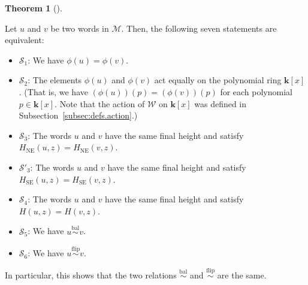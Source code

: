 \documentclass[numbers=enddot,12pt,final,onecolumn,notitlepage]{scrartcl}%
\theoremstyle{definition}
\newtheorem{theo}{Theorem}[section]
\newenvironment{theorem}[1][]
{\begin{theo}[#1]\begin{leftbar}}
{\end{leftbar}\end{theo}}
\newcommand{\W}{\mathcal{W}}
\newcommand{\M}{\mathcal{M}}
\newcommand{\kk}{\mathbf{k}}
\newcommand{\SE}{\operatorname{SE}}
\newcommand{\NE}{\operatorname{NE}}
\newcommand{\balsim}{\overset{\operatorname*{bal}}{\sim}}
\newcommand{\flipsim}{\overset{\operatorname*{flip}}{\sim}}
\newcommand{\tup}[1]{\left( #1 \right)}
\newcommand{\ive}[1]{\left[ #1 \right]}
\begin{document}
\begin{theorem}
\label{thm.DU-eqs2}
Let $u$ and $v$ be two words in $\M$.
Then, the following seven statements are equivalent:

\begin{itemize}
\item $\mathcal{S}_1$: We have $\phi\tup{u} = \phi\tup{v}$.

\item $\mathcal{S}_2$: The elements $\phi\tup{u}$ and
$\phi\tup{v}$ act equally on the polynomial ring $\kk\ive{x}$.
(That is, we have
$\tup{\phi\tup{u}} \tup{p} = \tup{\phi\tup{v}} \tup{p}$
for each polynomial $p \in \kk\ive{x}$.
Note that the action of $\W$ on $\kk\left[x\right]$
was defined in Subsection~\ref{subsec:defs.action}.)

\item $\mathcal{S}_3$: The words $u$ and $v$ have the same final
height and satisfy $H_{\NE}\tup{u, z} = H_{\NE}\tup{v, z}$.

\item $\mathcal{S}'_3$: The words $u$ and $v$ have the same final
height and satisfy $H_{\SE}\tup{u, z} = H_{\SE}\tup{v, z}$.

\item $\mathcal{S}_4$: The words $u$ and $v$ have the same final
height and satisfy $H\tup{u, z} = H\tup{v, z}$.

\item $\mathcal{S}_5$: We have $u \balsim v$.

\item $\mathcal{S}_6$: We have $u \flipsim v$.
\end{itemize}
\end{theorem}

In particular, this shows that the two relations $\balsim$ and $\flipsim$ are the same. 
\end{document}
